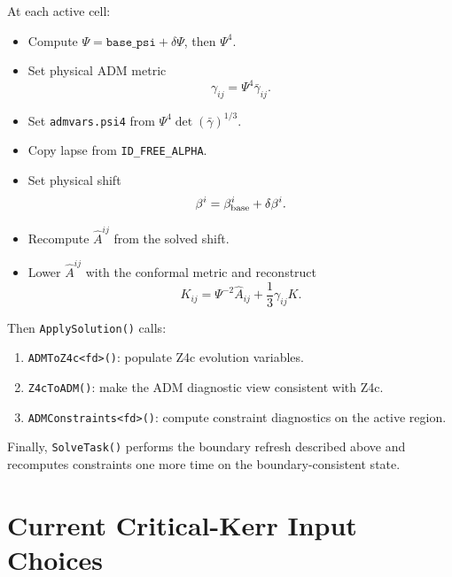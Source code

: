 \documentclass[11pt]{article}
\newcommand{\code}[1]{\texttt{#1}}
\begin{document}
At each active cell:
\begin{itemize}
  \item Compute \(\Psi = \code{base\_psi}+\delta\Psi\), then \(\Psi^4\).
  \item Set physical ADM metric
        \[
          \gamma_{ij} = \Psi^4 \bar{\gamma}_{ij}.
        \]
  \item Set \code{admvars.psi4} from \(\Psi^4\det(\bar{\gamma})^{1/3}\).
  \item Copy lapse from \code{ID\_FREE\_ALPHA}.
  \item Set physical shift
        \[
          \beta^i = \beta^i_{\rm base}+\delta\beta^i.
        \]
  \item Recompute \(\hat{A}^{ij}\) from the solved shift.
  \item Lower \(\hat{A}^{ij}\) with the conformal metric and reconstruct
        \[
          K_{ij} = \Psi^{-2}\hat{A}_{ij}
                 + \frac{1}{3}\gamma_{ij}K.
        \]
\end{itemize}

Then \code{ApplySolution()} calls:
\begin{enumerate}
  \item \code{ADMToZ4c<fd>()}: populate Z4c evolution variables.
  \item \code{Z4cToADM()}: make the ADM diagnostic view consistent with Z4c.
  \item \code{ADMConstraints<fd>()}: compute constraint diagnostics on the active
        region.
\end{enumerate}

Finally, \code{SolveTask()} performs the boundary refresh described above and
recomputes constraints one more time on the boundary-consistent state.

\section{Current Critical-Kerr Input Choices}
\end{document}

